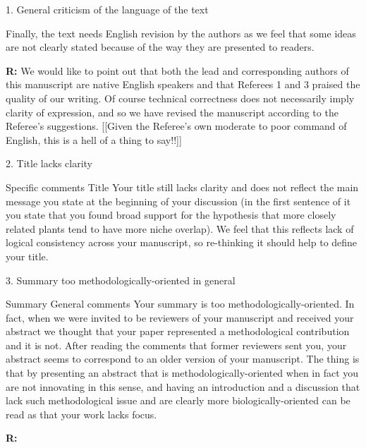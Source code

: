 \documentclass[12pt]{letter}
\newenvironment{refquote}{\bigskip \begin{it}}{\end{it}\smallskip}
\begin{document}
	1. General criticism of the language of the text

		\begin{refquote}

		Finally, the text needs English revision by the authors as we feel that some ideas are not clearly stated because of the way they are presented to readers. 

		\end{refquote}


		\textbf{R:} We would like to point out that both the lead and corresponding authors of this manuscript are native English speakers and that Referees 1 and 3 praised the quality of our writing. Of course technical correctness does not necessarily imply clarity of expression, and so we have revised the manuscript according to the Referee's suggestions. [[Given the Referee's own moderate to poor command of English, this is a hell of a thing to say!!]]


	2. Title lacks clarity

		\begin{refquote}
		Specific comments
		Title
		Your title still lacks clarity and does not reflect the main message you state at the beginning of your discussion (in the first sentence of it you state that you found broad support for the hypothesis that more closely related plants tend to have more niche overlap). We feel that this reflects lack of logical consistency across your manuscript, so re-thinking it should help to define your title.
		\end{refquote}


	3. Summary too methodologically-oriented in general

		\begin{refquote}
			Summary
			General comments
			Your summary is too methodologically-oriented. In fact, when we were invited to be reviewers of your manuscript and received your abstract we thought that your paper represented a methodological contribution and it is not. After reading the comments that former reviewers sent you, your abstract seems to correspond to an older version of your manuscript. The thing is that by presenting an abstract that is methodologically-oriented when in fact you are not innovating in this sense, and having an introduction and a discussion that lack such methodological issue and are clearly more biologically-oriented can be read as that your work lacks focus.
		\end{refquote}

		\textbf{R:}
\end{document}
